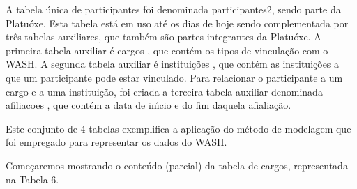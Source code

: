 \documentclass[
12pt,		%
openright,	%
twoside,  %
a4paper,			%
chapter=TITLE,		%
english,			%
french,				%
spanish,			%
brazil				%
]{USPSC-classe/USPSC}
\begin{document}
A tabela \'unica de participantes foi denominada \textquotedbl participantes2\textquotedbl , sendo parte da  \textquotedbl Platu\'oxe\textquotedbl . Esta tabela est\'a em uso at\'e os dias de hoje sendo complementada por tr\^es tabelas auxiliares, que tamb\'em s\~ao partes integrantes da \textquotedbl Platu\'oxe\textquotedbl . A primeira tabela auxiliar \'e \textquotedbl cargos \textquotedbl , que cont\'em os tipos de vincula\c{c}\~ao com o WASH. A segunda tabela auxiliar \'e \textquotedbl institui\c{c}\~oes \textquotedbl , que cont\'em as institui\c{c}\~oes a que um participante pode estar vinculado. Para relacionar o participante a um cargo e a uma institui\c{c}\~ao, foi criada a terceira tabela auxiliar denominada \textquotedbl afiliacoes \textquotedbl , que cont\'em a data de in\'{\i}cio e do fim daquela afialia\c{c}\~ao.









Este conjunto de 4 tabelas exemplifica a aplica\c{c}\~ao do m\'etodo de modelagem que foi empregado para representar os dados do WASH.









Come\c{c}aremos mostrando o conte\'udo (parcial) da tabela de \textquotedbl cargos\textquotedbl , representada na Tabela 6.
\end{document}
